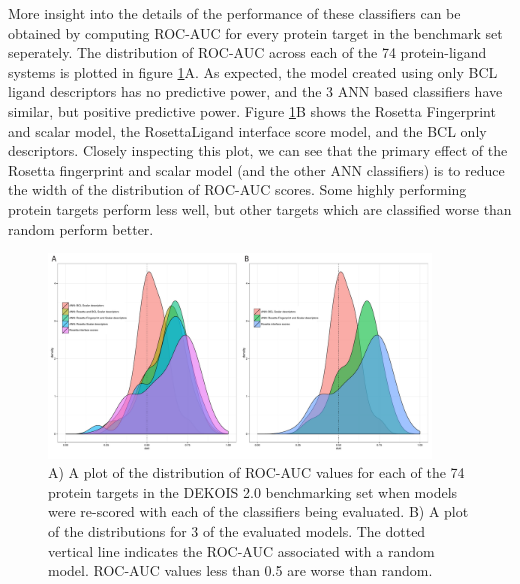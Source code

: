 More insight into the details of the performance of these classifiers can be obtained by computing \ac{ROC-AUC} for every protein target in the benchmark set seperately.
The distribution of \ac{ROC-AUC} across each of the 74 protein-ligand systems is plotted in figure \ref{fig:dekois_roc_all}A.
As expected, the model created using only \ac{BCL} ligand descriptors has no predictive power, and the 3 \ac{ANN} based classifiers have similar, but positive predictive power.
Figure \ref{fig:dekois_roc_all}B shows the Rosetta Fingerprint and scalar model, the RosettaLigand interface score model, and the \ac{BCL} only descriptors.
Closely inspecting this plot, we can see that the primary effect of the Rosetta fingerprint and scalar model (and the other \ac{ANN} classifiers) is to reduce the width of the distribution of \ac{ROC-AUC} scores.  Some highly performing protein targets perform less well, but other targets which are classified worse than random perform better. 
\begin{figure}
\centering
\includegraphics[width=4in]{figures/hts/auc_distributions.pdf}
\caption{
A) A plot of the distribution of \acs{ROC-AUC} values for each of the 74 protein targets in the DEKOIS 2.0 benchmarking set when models were re-scored with each of the classifiers being evaluated.
B) A plot of the distributions for 3 of the evaluated models.
The dotted vertical line indicates the \acs{ROC-AUC} associated with a random model.
\acs{ROC-AUC} values less than 0.5 are worse than random. 
}
\label{fig:dekois_roc_all}
\end{figure}

